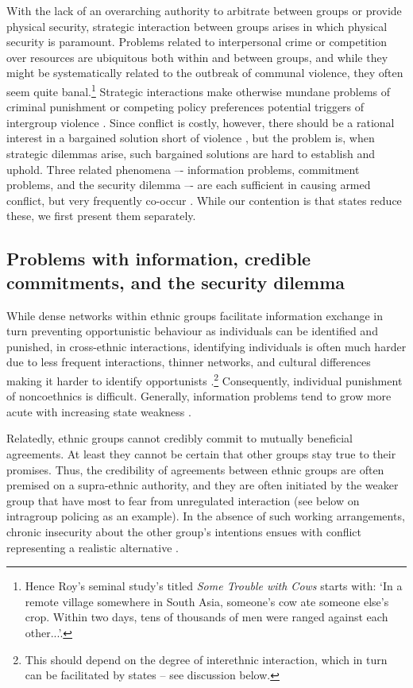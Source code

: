 \documentclass[12pt]{article}
\begin{document}
With the lack of an overarching authority to arbitrate between groups or provide
physical security, strategic interaction between groups arises in which physical
security is paramount. Problems related to interpersonal crime or competition
over resources are ubiquitous both within and between groups, and while they
might be systematically related to the outbreak of communal violence, they often
seem quite banal.\footnote{Hence Roy's \citep[1]{roy1994some} seminal study's
	titled \textit{Some Trouble with Cows} starts with: `In a remote village
somewhere in South Asia, someone's cow ate someone else's crop. Within two days,
tens of thousands of men were ranged against each other...'.} Strategic
interactions make otherwise mundane problems of criminal punishment or competing
policy preferences potential triggers of intergroup violence
\citep{diamond2013world, Eaton_2008, Fearon1995, Fearon_1996, Lake_1996}. Since
conflict is costly, however, there should be a rational interest in a bargained
solution short of violence \citep{Fearon1995}, but the problem is, when
strategic dilemmas arise, such bargained solutions are hard to establish and
uphold. Three related phenomena –- information problems, commitment problems,
and the security dilemma –- are each sufficient in causing armed conflict, but
very frequently co-occur \citep[46]{Lake_1996}. While our contention is that
states reduce these, we first present them separately.

\subsection{Problems with information, credible commitments, and the security
	dilemma} While dense networks within ethnic groups facilitate
	information exchange in turn preventing opportunistic behaviour as
	individuals can be identified and punished, in cross-ethnic
	interactions, identifying individuals is often much harder due to less
	frequent interactions, thinner networks, and cultural differences making
	it harder to identify opportunists
	\citep[719]{Fearon_1996}.\footnote{This should depend on the degree of
	interethnic interaction, which in turn can be facilitated by states –
see discussion below.} Consequently, individual punishment of noncoethnics is
difficult. Generally, information problems tend to grow more acute with
increasing state weakness \citep[46]{Fearon1995, Lake_1996}.

Relatedly, ethnic groups cannot credibly commit to mutually beneficial
agreements. At least they cannot be certain that other groups stay true to their
promises. Thus, the credibility of agreements between ethnic groups are often
premised on a supra-ethnic authority, and they are often initiated by the weaker
group that have most to fear from unregulated interaction (see below on
intragroup policing as an example)\citep[50]{Lake_1996}. In the absence of such
working arrangements, chronic insecurity about the other group’s intentions
ensues with conflict representing a realistic alternative \citep[51]{Lake_1996}.
\end{document}
